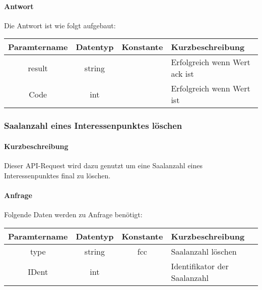\paragraph{Antwort}Die Antwort ist wie folgt aufgebaut:
\begin{table}[H]
	\begin{tabular}{|c|c|c|p{6.5cm}|}
		\hline
		\textbf{Paramtername} & \textbf{Datentyp} & \textbf{Konstante} & \textbf{Kurzbeschreibung}                                                                                               \\ \hline
		result              & string           &                 & Erfolgreich wenn Wert {\glqq ack\grqq} ist \\ \hline
		Code                & int              &                 & Erfolgreich wenn Wert {\glqq 0\grqq} ist \\ \hline
	\end{tabular}
\end{table}
\subsubsection{Saalanzahl eines Interessenpunktes löschen}
\paragraph{Kurzbeschreibung}Dieser API-Request wird dazu genutzt um eine Saalanzahl eines Interessenpunktes final zu löschen.
\paragraph{Anfrage}Folgende Daten werden zu Anfrage benötigt:
\begin{table}[H]
	\begin{tabular}{|c|c|c|p{6.5cm}|}
		\hline
		\textbf{Paramtername} & \textbf{Datentyp} & \textbf{Konstante} & \textbf{Kurzbeschreibung}                                                                                               \\ \hline
		type                & string            & fcc                & Saalanzahl löschen \\ \hline
		IDent               & int               &                    & Identifikator der Saalanzahl \\ \hline
	\end{tabular}
\end{table}

